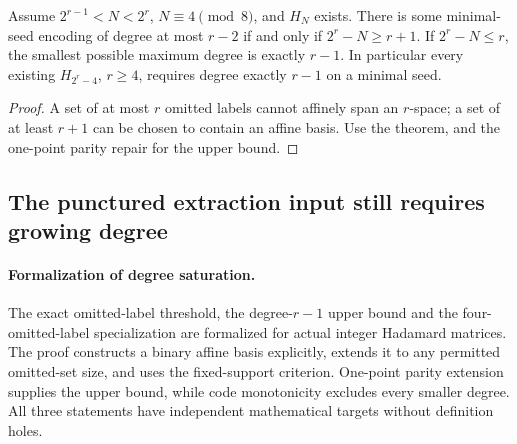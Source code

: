 \begin{corollary}
\label{s21:cor:nonlinear-degree-saturation}
Assume $2^{r-1}<N<2^r$, $N\equiv4\pmod8$, and $H_N$ exists.
There is some minimal-seed encoding of degree at most $r-2$ if and
only if $2^r-N\ge r+1$. If $2^r-N\le r$, the smallest possible maximum
degree is exactly $r-1$. In particular every existing
$H_{2^r-4}$, $r\ge4$, requires degree exactly $r-1$ on a minimal seed.
\end{corollary}
\begin{proof}
A set of at most $r$ omitted labels cannot affinely span an $r$-space;
a set of at least $r+1$ can be chosen to contain an affine basis.
Use the theorem, and the one-point parity repair for the upper bound.
\end{proof}

\subsection{The punctured extraction input still requires growing degree}
\paragraph{Formalization of degree saturation.}
The exact omitted-label threshold, the degree-$r-1$ upper bound and
the four-omitted-label specialization are formalized for actual integer
Hadamard matrices. The proof constructs a binary affine basis explicitly,
extends it to any permitted omitted-set size, and uses the fixed-support
criterion. One-point parity extension supplies the upper bound, while
code monotonicity excludes every smaller degree. All three statements
have independent mathematical targets without definition holes.

